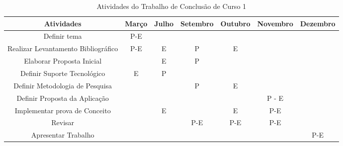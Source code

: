 \begin{table}[ht]
	\centering
	\caption{Atividades do Trabalho de Conclusão de Curso 1}
	\label{tab04}
	
	\begin{tabular}{ccccccc}
		\toprule
		\textbf{Atividades} & \textbf{Março} & 
		\textbf{Julho}  & \textbf{Setembro}& \textbf{Outubro} & \textbf{Novembro} & \textbf{Dezembro}\\
		\midrule
		Definir tema & P-E & & &  &\\
		\midrule
		\begin{minipage} [t] {0.2\textwidth} \centering Realizar Levantamento Bibliográfico \end{minipage} & P-E & E & P & E & & \\
		\midrule
		\begin{minipage} [t] {0.2\textwidth} \centering Elaborar Proposta Inicial\end{minipage} &  & E & P &  &  &\\
		\midrule
		\begin{minipage} [t] {0.2\textwidth} \centering Definir Suporte Tecnológico \end{minipage} & E & P & &  & &\\
		\midrule
		\begin{minipage} [t] {0.2\textwidth} \centering Definir Metodologia de Pesquisa\end{minipage} &  &  & P & E & &\\
		\midrule
		\begin{minipage} [t] {0.2\textwidth} \centering Definir Proposta da Aplicação \end{minipage} &  & & &  & P - E &\\
		\midrule
		\begin{minipage} [t] {0.2\textwidth} \centering Implementar prova de Conceito \end{minipage} &  & E & & E & P-E &\\
		\midrule
		\begin{minipage} [t] {0.2\textwidth} \centering Revisar \end{minipage} &  & & P-E & P-E & P-E &\\
		\midrule
		\begin{minipage} [t] {0.2\textwidth} \centering Apresentar Trabalho \end{minipage} &  &  & &  & & P-E\\
		\bottomrule
	\end{tabular}
\end{table}


